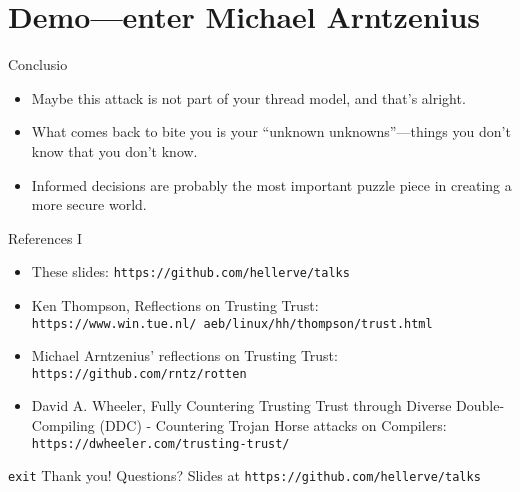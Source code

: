 \documentclass[aspectratio=169]{beamer}
\begin{document}
  \section{Demo—enter Michael Arntzenius}
  \begin{frame}{Conclusio}
    \begin{itemize}
      \item Maybe this attack is not part of your thread model, and that’s
            alright.
      \item What comes back to bite you is your “unknown unknowns”—things you
            don’t know that you don’t know.
      \item Informed decisions are probably the most important puzzle piece in
            creating a more secure world.
    \end{itemize}
  \end{frame}
  \begin{frame}{References I}
    \begin{itemize}
      \item These slides: \texttt{https://github.com/hellerve/talks}
      \item Ken Thompson, Reflections on Trusting Trust: \texttt{https://www.win.tue.nl/~aeb/linux/hh/thompson/trust.html}
      \item Michael Arntzenius’ reflections on Trusting Trust: \texttt{https://github.com/rntz/rotten}
      \item David A. Wheeler, Fully Countering Trusting Trust through Diverse Double-Compiling (DDC) - Countering Trojan Horse attacks on Compilers: \texttt{https://dwheeler.com/trusting-trust/}
    \end{itemize}
  \end{frame}
  \begin{frame}{\texttt{exit}}
    \Huge Thank you!
    \linebreak
    \linebreak
    \linebreak
    \small Questions?
    \linebreak
    \linebreak
    \tiny Slides at \texttt{https://github.com/hellerve/talks}
  \end{frame}
\end{document}
